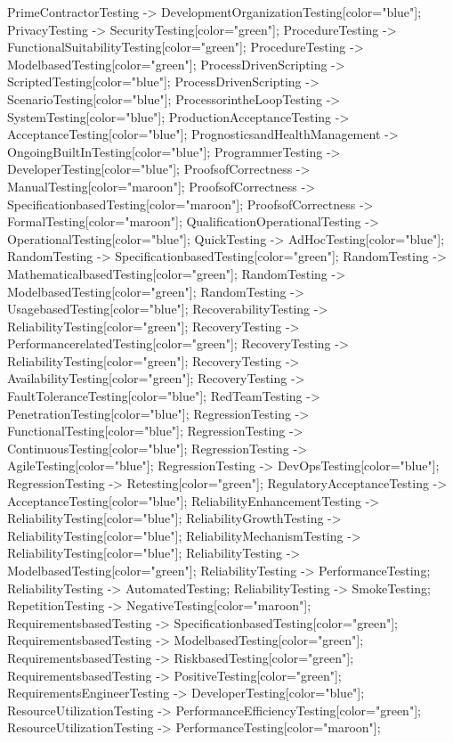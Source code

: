 \documentclass{article}
\begin{document}
{PrimeContractorTesting -> DevelopmentOrganizationTesting[color="blue"];
PrivacyTesting -> SecurityTesting[color="green"];
ProcedureTesting -> FunctionalSuitabilityTesting[color="green"];
ProcedureTesting -> ModelbasedTesting[color="green"];
ProcessDrivenScripting -> ScriptedTesting[color="blue"];
ProcessDrivenScripting -> ScenarioTesting[color="blue"];
ProcessorintheLoopTesting -> SystemTesting[color="blue"];
ProductionAcceptanceTesting -> AcceptanceTesting[color="blue"];
PrognosticsandHealthManagement -> OngoingBuiltInTesting[color="blue"];
ProgrammerTesting -> DeveloperTesting[color="blue"];
ProofsofCorrectness -> ManualTesting[color="maroon"];
ProofsofCorrectness -> SpecificationbasedTesting[color="maroon"];
ProofsofCorrectness -> FormalTesting[color="maroon"];
QualificationOperationalTesting -> OperationalTesting[color="blue"];
QuickTesting -> AdHocTesting[color="blue"];
RandomTesting -> SpecificationbasedTesting[color="green"];
RandomTesting -> MathematicalbasedTesting[color="green"];
RandomTesting -> ModelbasedTesting[color="green"];
RandomTesting -> UsagebasedTesting[color="blue"];
RecoverabilityTesting -> ReliabilityTesting[color="green"];
RecoveryTesting -> PerformancerelatedTesting[color="green"];
RecoveryTesting -> ReliabilityTesting[color="green"];
RecoveryTesting -> AvailabilityTesting[color="green"];
RecoveryTesting -> FaultToleranceTesting[color="blue"];
RedTeamTesting -> PenetrationTesting[color="blue"];
RegressionTesting -> FunctionalTesting[color="blue"];
RegressionTesting -> ContinuousTesting[color="blue"];
RegressionTesting -> AgileTesting[color="blue"];
RegressionTesting -> DevOpsTesting[color="blue"];
RegressionTesting -> Retesting[color="green"];
RegulatoryAcceptanceTesting -> AcceptanceTesting[color="blue"];
ReliabilityEnhancementTesting -> ReliabilityTesting[color="blue"];
ReliabilityGrowthTesting -> ReliabilityTesting[color="blue"];
ReliabilityMechanismTesting -> ReliabilityTesting[color="blue"];
ReliabilityTesting -> ModelbasedTesting[color="green"];
ReliabilityTesting -> PerformanceTesting;
ReliabilityTesting -> AutomatedTesting;
ReliabilityTesting -> SmokeTesting;
RepetitionTesting -> NegativeTesting[color="maroon"];
RequirementsbasedTesting -> SpecificationbasedTesting[color="green"];
RequirementsbasedTesting -> ModelbasedTesting[color="green"];
RequirementsbasedTesting -> RiskbasedTesting[color="green"];
RequirementsbasedTesting -> PositiveTesting[color="green"];
RequirementsEngineerTesting -> DeveloperTesting[color="blue"];
ResourceUtilizationTesting -> PerformanceEfficiencyTesting[color="green"];
ResourceUtilizationTesting -> PerformanceTesting[color="maroon"];
}
\end{document}
